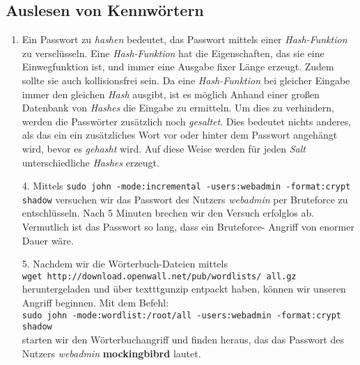 \documentclass{scrartcl}
\begin{document}
      \subsection{Auslesen von Kennwörtern}
      \label{sub:Auslesen von Kennwörtern}

      \begin{enumerate}
        \item Ein Passwort zu \textit{hashen} bedeutet, das Passwort mittels
              einer \textit{Hash-Funktion} zu versclüsseln. Eine
              \textit{Hash-Funktion} hat die Eigenschaften, das sie eine
              Einwegfunktion ist, und immer eine Ausgabe fixer Länge erzeugt.
              Zudem sollte sie auch kollisionsfrei sein. Da eine
              \textit{Hash-Funktion} bei gleicher Eingabe immer den gleichen
              \textit{Hash} ausgibt, ist es möglich Anhand einer großen
              Datenbank von \textit{Hashes} die Eingabe zu ermitteln. Um dies
              zu verhindern, werden die Passwörter zusätzlich noch
              \textit{gesaltet}. Dies bedeutet nichts anderes, als das ein
              ein zusätzliches Wort vor oder hinter dem Passwort angehängt
              wird, bevor es \textit{gehasht} wird. Auf diese Weise werden
              für jeden \textit{Salt} unterschiedliche \textit{Hashes} erzeugt.
        \item[4.] Mittels \texttt{sudo john -mode:incremental -users:webadmin
                  -format:crypt shadow} versuchen wir das Passwort des Nutzers
                  \textit{webadmin} per Bruteforce zu entschlüsseln.
                  Nach 5 Minuten brechen wir den Versuch erfolglos ab.
                  Vermutlich ist das Passwort so lang, dass ein Bruteforce-
                  Angriff von enormer Dauer wäre.
        \item[5.] Nachdem wir die Wörterbuch-Dateien mittels \\
                  \texttt{wget http://download.openwall.net/pub/wordlists/
                  all.gz} \\ heruntergeladen und über texttt{gunzip} entpackt
                  haben, können wir unseren Angriff beginnen. Mit dem Befehl: \\
                  \texttt{sudo john -mode:wordlist:/root/all -users:webadmin
                  -format:crypt shadow} \\ starten wir den Wörterbuchangriff und
                  finden heraus, das das Passwort des Nutzers \textit{webadmin}
                  \textbf{mockingbibrd} lautet.
      \end{enumerate}
\end{document}
